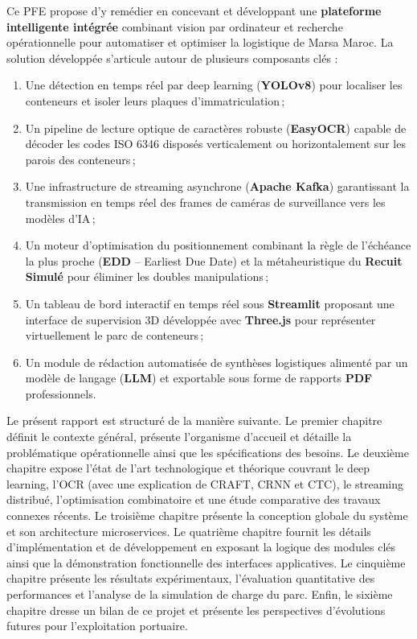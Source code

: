 \documentclass[12pt,a4paper]{article}
\begin{document}
Ce \ac{PFE} propose d'y remédier en concevant et développant une \textbf{plateforme intelligente intégrée} combinant vision par ordinateur et recherche opérationnelle pour automatiser et optimiser la logistique de Marsa Maroc. La solution développée s'articule autour de plusieurs composants clés :
\begin{enumerate}
  \item Une détection en temps réel par deep learning (\textbf{YOLOv8}) \cite{Redmon2016, Ultralytics} pour localiser les conteneurs et isoler leurs plaques d'immatriculation\,;
  \item Un pipeline de lecture optique de caractères robuste (\textbf{EasyOCR}) \cite{Baek2019CRAFT, Shi2016CRNN} capable de décoder les codes ISO 6346 disposés verticalement ou horizontalement sur les parois des conteneurs\,;
  \item Une infrastructure de streaming asynchrone (\textbf{Apache Kafka}) \cite{Kafka} garantissant la transmission en temps réel des frames de caméras de surveillance vers les modèles d'IA\,;
  \item Un moteur d'optimisation du positionnement combinant la règle de l'échéance la plus proche (\textbf{EDD} -- Earliest Due Date) \cite{Baker2009} et la métaheuristique du \textbf{Recuit Simulé} \cite{Kirkpatrick1983} pour éliminer les doubles manipulations\,;
  \item Un tableau de bord interactif en temps réel sous \textbf{Streamlit} proposant une interface de supervision 3D développée avec \textbf{Three.js} pour représenter virtuellement le parc de conteneurs\,;
  \item Un module de rédaction automatisée de synthèses logistiques alimenté par un modèle de langage (\textbf{LLM}) et exportable sous forme de rapports \textbf{PDF} professionnels.
\end{enumerate}

Le présent rapport est structuré de la manière suivante. Le premier chapitre définit le contexte général, présente l'organisme d'accueil et détaille la problématique opérationnelle ainsi que les spécifications des besoins. Le deuxième chapitre expose l'état de l'art technologique et théorique couvrant le deep learning, l'OCR (avec une explication de CRAFT, CRNN et CTC), le streaming distribué, l'optimisation combinatoire et une étude comparative des travaux connexes récents. Le troisième chapitre présente la conception globale du système et son architecture microservices. Le quatrième chapitre fournit les détails d'implémentation et de développement en exposant la logique des modules clés ainsi que la démonstration fonctionnelle des interfaces applicatives. Le cinquième chapitre présente les résultats expérimentaux, l'évaluation quantitative des performances et l'analyse de la simulation de charge du parc. Enfin, le sixième chapitre dresse un bilan de ce projet et présente les perspectives d'évolutions futures pour l'exploitation portuaire.
\end{document}
